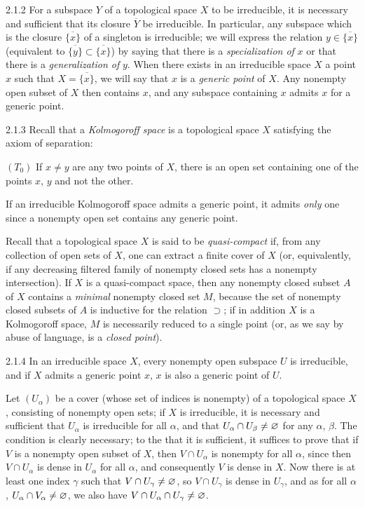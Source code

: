 \begin{env}{2.1.2}
\label{env-0.2.1.2}
For a subspace $Y$ of a topological space $X$ to be irreducible, it is necessary and
sufficient that its closure $\overline{Y}$ be irreducible. In particular, any subspace which
is the closure $\overline{\{x\}}$ of a singleton is irreducible; we will express the relation
$y\in\overline{\{x\}}$ (equivalent to $\overline{\{y\}}\subset\overline{\{x\}}$) by saying
that there is a \emph{specialization of} $x$ or that there is a \emph{generalization of} $y$.
When there exists in an irreducible space $X$ a point $x$ such that $X=\overline{\{x\}}$, we
will say that $x$ is a \emph{generic point} of $X$. Any nonempty open subset of $X$ then
contains $x$, and any subspace containing $x$ admits $x$ for a generic point.
\end{env}

\begin{env}{2.1.3}
\label{env-0.2.1.3}
Recall that a \emph{Kolmogoroff space} is a topological space $X$ satisfying the axiom of
separation:

$(T_0)$ If $x\neq y$ are any two points of $X$, there is an open set containing one of the
points $x$, $y$ and not the other.

If an irreducible Kolmogoroff space admits a generic point, it admits \emph{only} one since a
nonempty open set contains any generic point.

Recall that a topological space $X$ is said to be \emph{quasi-compact} if, from any
collection of open sets of $X$, one can extract a finite cover of $X$ (or, equivalently, if
any decreasing filtered family of nonempty closed sets has a nonempty intersection). If $X$
is a quasi-compact space, then any nonempty closed subset $A$ of $X$ contains a
\emph{minimal} nonempty closed set $M$, because the set of nonempty closed subsets of $A$ is
inductive for the relation $\supset$; if in addition $X$ is a Kolmogoroff space, $M$ is
necessarily reduced to a single point (or, as we say by abuse of language, is a \emph{closed
point}).
\end{env}

\begin{env}{2.1.4}
\label{env-0.2.1.4}
In an irreducible space $X$, every nonempty open subspace $U$ is irreducible, and if $X$
admits a generic point $x$, $x$ is also a generic point of $U$.

Let $(U_\alpha)$ be a cover (whose set of indices is nonempty) of a topological space $X$,
consisting of nonempty open sets; if $X$ is irreducible, it is necessary and sufficient that
$U_\alpha$ is irreducible for all $\alpha$, and that $U_\alpha\cap U_\beta\neq\varnothing$ for any
$\alpha$, $\beta$. The condition is clearly necessary; to the that it is sufficient, it
suffices to prove that if $V$ is a nonempty open subset of $X$, then $V\cap U_\alpha$ is
nonempty for all $\alpha$, since then $V\cap U_\alpha$ is dense in $U_\alpha$ for all
$\alpha$, and consequently $V$ is dense in $X$. Now there is at least one index $\gamma$ such
that $V\cap U_\gamma\neq\varnothing$, so $V\cap U_\gamma$ is dense in $U_\gamma$, and as for all
$\alpha$, $U_\alpha\cap V_\alpha\neq\varnothing$, we also have
$V\cap U_\alpha\cap U_\gamma\neq\varnothing$.
\end{env}

